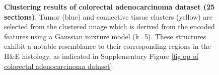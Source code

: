 \documentclass{WileyMSP-template}
\begin{document}
\begin{figure}[htbp]
    \captionsetup{justification=raggedright,singlelinecheck=false}
    \caption{
      \textbf{Clustering results of colorectal adenocarcinoma dataset (25 sections)}. 
      Tumor (blue) and connective tissue 
      clusters (yellow) are selected from the 
      clustered image which is derived 
      from the encoded features using a Gaussian mixture model 
      (k=5). These structures exhibit 
      a notable resemblance to their corresponding regions in the H\&E 
      histology, as indicated in Supplementary Figure 
      \ref{fig:op of colorectal adenocarcinoma dataset}.
      }
    \label{fig:Clusters of colorectal adenocarcinoma dataset}
\end{figure}

\begin{figure}[htbp]
  \centering

\end{figure}
\end{document}
